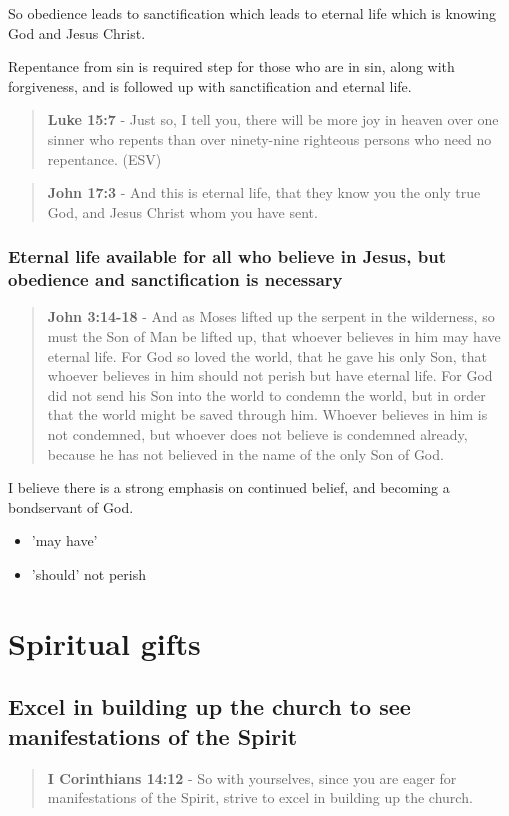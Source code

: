 \documentclass[11pt]{article}
\begin{document}
So obedience leads to sanctification which leads to eternal life which is knowing God and Jesus Christ.

Repentance from sin is required step for those who are in sin, along with forgiveness, and is followed up with sanctification and eternal life.

\begin{quote}
\textbf{Luke 15:7} - Just so, I tell you, there will be more joy in heaven over one sinner who repents than over ninety-nine righteous persons who need no repentance. (ESV)
\end{quote}

\begin{quote}
\textbf{John 17:3} - And this is eternal life, that they know you the only true God, and Jesus Christ whom you have sent.
\end{quote}

\subsubsection{Eternal life \textbf{available} for all who believe in Jesus, but obedience and sanctification is necessary}
\label{sec:org4c9a9e3}


\begin{quote}
\textbf{John 3:14-18} - And as Moses lifted up the serpent in the wilderness, so must the Son of Man be lifted up, that whoever believes in him may have eternal life. For God so loved the world, that he gave his only Son, that whoever believes in him should not perish but have eternal life. For God did not send his Son into the world to condemn the world, but in order that the world might be saved through him. Whoever believes in him is not condemned, but whoever does not believe is condemned already, because he has not believed in the name of the only Son of God.
\end{quote}

I believe there is a strong emphasis on continued belief, and becoming a bondservant of God.
\begin{itemize}
\item 'may have'
\item 'should' not perish
\end{itemize}

\section{Spiritual gifts}
\label{sec:orgb8c5245}
\subsection{Excel in building up the church to see manifestations of the Spirit}
\label{sec:org298ac4b}
\begin{quote}
\textbf{I Corinthians 14:12} - So with yourselves, since you are eager for manifestations of the Spirit, strive to excel in building up the church.
\end{quote}
\end{document}
